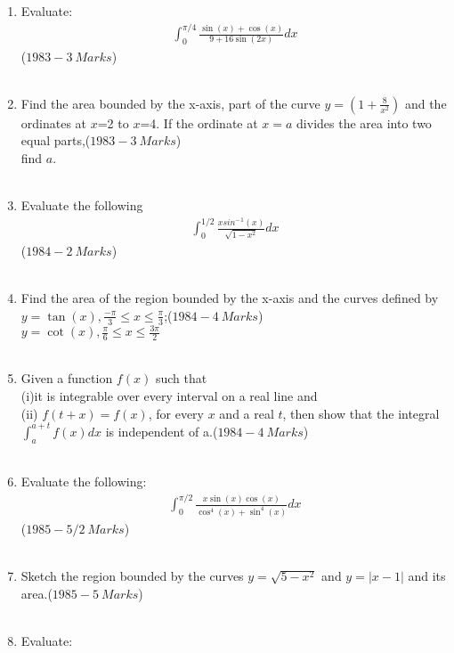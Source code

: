 \documentclass[journal,12pt,twocolumn]{IEEEtran}
\theoremstyle{remark}
\begin{document}
\begin{enumerate}
    \item Evaluate:\begin{align*}
     \int_{0}^{\pi/4}\frac{\sin{(x)}+\cos{(x)}}{9+16\sin{(2x)}}dx\end{align*} \hfill($1983-3\ Marks$)\\\\
\item Find the area bounded by the x-axis, part of the curve $y=(1+\frac{8}{x^2})$ and the ordinates at $x$=2 to $x$=4. If the ordinate at $x=a$ divides the area into two equal parts,\hfill($1983-3\ Marks$)\\find $a$.\\\\
\item Evaluate the following\begin{align*}
    \int_{0}^{1/2}\frac{xsin^-{}^1(x)}{\sqrt{1-x^2}}dx
\end{align*}\hfill($1984-2\ Marks$)\\\\
\item Find the area of the region bounded by the x-axis and the curves defined by $y=\tan{(x)}, \frac{-\pi}{3}\leq x \leq\frac{\pi}{3}$;\hfill($1984-4\ Marks$)\\$y=\cot{(x)}, \frac{\pi}{6}\leq x \leq\frac{3\pi}{2}$\\\\
\item Given a function $f(x)$ such that\\(i)it is integrable over every interval on a real line and\\(ii) $f(t+x)=f(x)$, for every $x$ and a real $t$, then show that the integral$\int_{a}^{a+t}f(x) dx$ is independent of a.\hfill($1984-4\ Marks$)\\\\
\item Evaluate the following:\begin{align*}
    \int_{0}^{\pi/2}\frac{x\sin{(x)}\cos{(x)}}{\cos^4{(x)}+\sin^4{(x)}}dx
\end{align*}\hfill($1985-5/2\ Marks$)\\\\
\item Sketch the region bounded by the curves $y=\sqrt{5-x^2}$ and $y=|x-1|$ and its\\ area.\hfill($1985-5\ Marks$)\\\\
\item Evaluate:\begin{align*}

\end{align*}
\end{enumerate}
\end{document}
